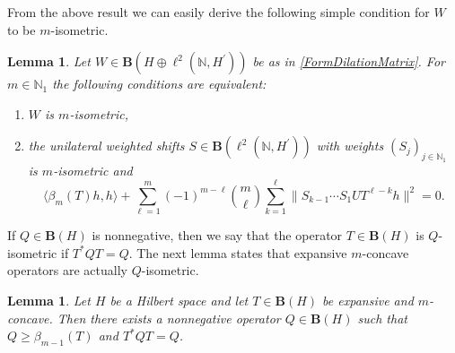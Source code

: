 \documentclass{amsart}
\renewcommand{\ge}{\geqslant}
\newtheorem{lemma}[theorem]{Lemma}
\theoremstyle{definition}
\numberwithin{equation}{section}
\begin{document}
From the above result we can easily derive the following simple condition for $ W $ to be $ m $-isometric.
\begin{lemma}
    \label{LemMIsometricityOfDilation}
    Let $ W\in \mathbf{B}(H\oplus\ell^{2}(\mathbb{N},H^{\prime})) $ be as in \eqref{FormDilationMatrix}. For $ m \in \mathbb{N}_{1} $ the following conditions are equivalent:
    \begin{enumerate}
        \item $ W $ is $ m $-isometric,
        \item the unilateral weighted shifts $ S\in \mathbf{B}(\ell^{2}(\mathbb{N},H^{\prime})) $ with weights $ (S_{j})_{j\in \mathbb{N}_{1}} $ is $ m $-isometric and
        \begin{equation}
            \label{FormDilationMatrixMIsometric}
            \langle \beta_{m}(T)h,h\rangle +\sum_{\ell=1}^{m}(-1)^{m-\ell}\binom{m}{\ell}\sum_{k=1}^{\ell} \lVert S_{k-1}\cdots S_{1}UT^{\ell-k}h\rVert^{2} = 0.
        \end{equation}
    \end{enumerate}
\end{lemma}
If $ Q\in \mathbf{B}(H) $ is nonnegative, then we say that the operator $ T\in \mathbf{B}(H) $ is $ Q $-isometric if $ T^{\ast}QT = Q $. The next lemma states that expansive $ m $-concave operators are actually $ Q $-isometric.
\begin{lemma}
    \label{LemMConcaveAreQIsometries}
    Let $ H $ be a Hilbert space and let $ T\in \mathbf{B}(H) $ be expansive and $ m $-concave. Then there exists a nonnegative operator $ Q\in \mathbf{B}(H) $ such that $ Q\ge \beta_{m-1}(T) $ and $ T^{\ast} QT = Q $.
\end{lemma}
\end{document}

